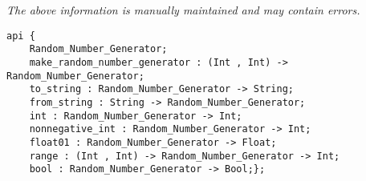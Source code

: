 \label{api:Random}

{\tiny \it The above information is manually maintained and may contain errors.}
\begin{verbatim}
api {
    Random_Number_Generator;
    make_random_number_generator : (Int , Int) -> Random_Number_Generator;
    to_string : Random_Number_Generator -> String;
    from_string : String -> Random_Number_Generator;
    int : Random_Number_Generator -> Int;
    nonnegative_int : Random_Number_Generator -> Int;
    float01 : Random_Number_Generator -> Float;
    range : (Int , Int) -> Random_Number_Generator -> Int;
    bool : Random_Number_Generator -> Bool;};
\end{verbatim}
